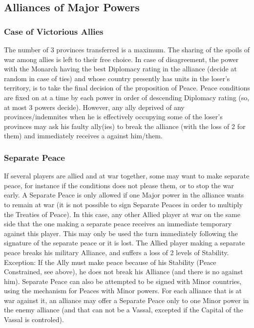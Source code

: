 \subsection{Alliances of Major Powers}


\subsubsection{Case of Victorious Allies}
\aparag The number of 3 provinces transferred is a maximum. The sharing of the
spoils of war among allies is left to their free choice.
\aparag In case of disagreement, the power with the Monarch having the best
Diplomacy rating in the alliance (decide at random in case of ties) and whose
country presently has units in the loser's territory, is to take the final
decision of the proposition of Peace. Peace conditions are fixed on at a time
by each power in order of descending Diplomacy rating (so, at most 3 powers
decide).
\aparag However, any ally deprived of any provinces/indemnites when he is
effectively occupying some of the loser's provinces may ask his faulty
ally(ies) to break the alliance (with the loss of 2 \STAB for them) and
immediately receives a \CB against him/them.


\subsubsection{Separate Peace}
\aparag If several players are allied and at war together, some may want to
make separate peace, for instance if the conditions does not please them, or
to stop the war early. A Separate Peace is only allowed if one Major power in
the alliance wants to remain at war (it is not possible to sign Separate
Peaces in order to multiply the Treaties of Peace).
In this case, any other Allied player at war on the same side that the one
making a separate peace receives an immediate temporary \CB against this
player.
\bparag This \CB may only be used the turn immediately following the signature
of the separate peace or it is lost.
\bparag The Allied player making a separate peace breaks his military
Alliance, and suffers a loss of 2 levels of Stability.
\bparag Exception: If the Ally must make peace because of his Stability (Peace
Constrained, see above), he does not break his Alliance (and there is no \CB
against him).
\aparag Separate Peace can also be attempted to be signed with Minor
countries, using the mechanism for Peaces with Minor powers. For each alliance
that is at war against it, an alliance may offer a Separate Peace only to one
Minor power in the enemy alliance (and that can not be a Vassal, excepted if
the Capital of the Vassal is controled).



